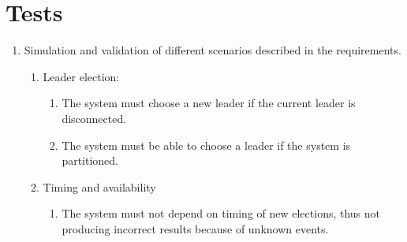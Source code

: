\section{Tests}

\begin{enumerate}
\item Simulation and validation of different scenarios described in the requirements.
	\begin{enumerate}
	\item Leader election:
		\begin{enumerate}
		\item The system must choose a new leader if the current leader is disconnected.
		\item The system must be able to choose a leader if the system is partitioned.
		\end{enumerate}
	\item Timing and availability
		\begin{enumerate}
		\item The system must not depend on timing of new elections, thus not producing incorrect results because of unknown events.
		\end{enumerate}
	\end{enumerate}
\end{enumerate}